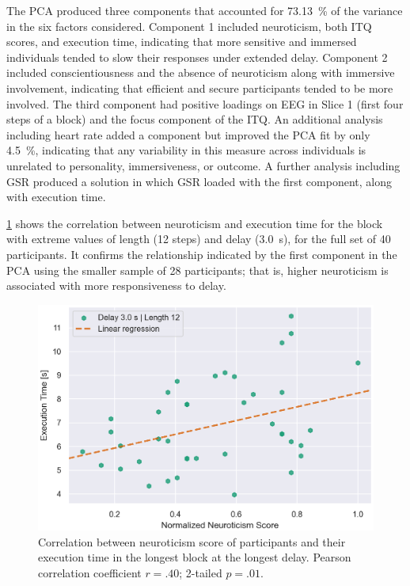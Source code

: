 The PCA produced three components that accounted for \SI{73.13}{\percent} of the variance in the six factors considered.
Component 1 included neuroticism, both ITQ scores, and execution time, indicating that more sensitive and immersed individuals tended to slow their responses under extended delay.
Component 2 included conscientiousness and the absence of neuroticism along with immersive involvement, indicating that efficient and secure participants tended to be more involved.
The third component had positive loadings on EEG in Slice 1 (first four steps of a block) and the focus component of the ITQ.\@
An additional analysis including heart rate added a component but improved the PCA fit by only \SI{4.5}{\percent}, indicating that any variability in this measure across individuals is unrelated to personality, immersiveness, or outcome.
A further analysis including GSR produced a solution in which GSR loaded with the first component, along with execution time.

\cref{fig:neuro:exectime:reg} shows the correlation between neuroticism and execution time for the block with extreme values of length (12 steps) and delay (\SI{3.0}{\second}), for the full set of 40 participants.
It confirms the relationship indicated by the first component in the PCA using the smaller sample of 28 participants; that is, higher neuroticism is associated with more responsiveness to delay.

\begin{figure}[h]
    \centering
    \includegraphics[width=.8\textwidth]{publications/2021ImpactDelayedResponse/Fig12.eps}
    \caption{Correlation between neuroticism score of participants and their execution time in the longest block at the longest delay.
    Pearson correlation coefficient \( r = .40 \); 2-tailed \( p = .01 \).}
    \label{fig:neuro:exectime:reg}
\end{figure}

